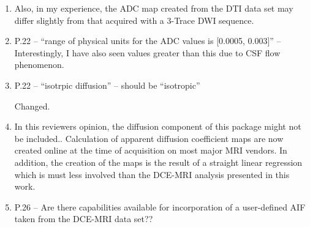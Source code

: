 \documentclass[11pt]{article}
\begin{document}
\begin{enumerate}
\item Also, in my experience, the ADC map created from the DTI data
  set may differ slightly from that acquired with a 3-Trace DWI
  sequence.

\item P.22 – ``range of physical units for the ADC values is [0.0005,
  0.003]'' – Interestingly, I have also seen values greater than this
  due to CSF flow phenomenon.

\item P.22 – ``isotrpic diffusion'' – should be ``isotropic''

  Changed.

\item In this reviewers opinion, the diffusion component of this
  package might not be included..  Calculation of apparent diffusion
  coefficient maps are now created online at the time of acquisition
  on most major MRI vendors.  In addition, the creation of the maps is
  the result of a straight linear regression which is must less
  involved than the DCE-MRI analysis presented in this work.

\item P.26 – Are there capabilities available for incorporation of a
  user-defined AIF taken from the DCE-MRI data set??

\end{enumerate}




\end{document}
